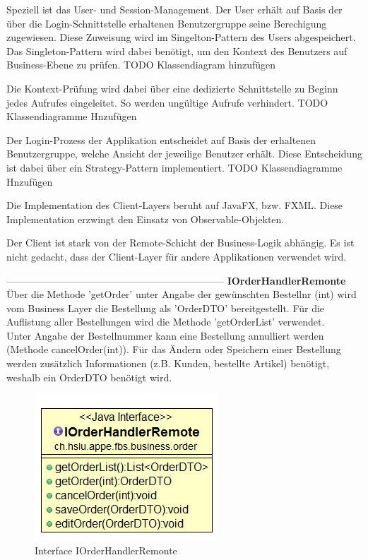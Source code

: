 Speziell ist das User- und Session-Management. Der User erhält auf Basis der über die Login-Schnittstelle erhaltenen Benutzergruppe seine Berechigung zugewiesen. Diese Zuweisung wird im Singelton-Pattern des Users abgespeichert.
Das Singleton-Pattern wird dabei benötigt, um den Kontext des Benutzers auf Business-Ebene zu prüfen.
TODO Klassendiagram hinzufügen

Die Kontext-Prüfung wird dabei über eine dedizierte Schnittstelle zu Beginn jedes Aufrufes eingeleitet. So werden ungültige Aufrufe verhindert.
TODO Klassendiagramme Hnzufügen

Der Login-Prozess der Applikation entscheidet auf Basis der erhaltenen Benutzergruppe, welche Ansicht der jeweilige Benutzer erhält. Diese Entscheidung ist dabei über ein Strategy-Pattern implementiert. 
TODO Klassendiagramme Hnzufügen

Die Implementation des Client-Layers beruht auf JavaFX, bzw. FXML. Diese Implementation erzwingt den Einsatz von Observable-Objekten.

Der Client ist stark von der Remote-Schicht der Business-Logik abhängig. Es ist nicht gedacht, dass der Client-Layer für andere Applikationen verwendet wird.
\newline

------------------------------------------------------------------
\textbf{IOrderHandlerRemonte}\\
Über die Methode 'getOrder' unter Angabe der gewünschten Bestellnr (int) wird vom Business Layer die Bestellung als 'OrderDTO' bereitgestellt. Für die Auflistung aller Bestellungen wird die Methode 'getOrderList' verwendet.\\
Unter Angabe der Bestellnummer kann eine Bestellung annulliert werden (Methode cancelOrder(int)). Für das Ändern oder Speichern einer Bestellung werden zusätzlich Informationen (z.B. Kunden, bestellte Artikel) benötigt, weshalb ein OrderDTO benötigt wird.


\begin{figure}[H]
	\includegraphics[width=0.3\linewidth]{Images/IOrderHandlerRemonte}
	\caption{Interface IOrderHandlerRemonte}
	\label{fig:if-IOrderHandlerRemonte}
\end{figure}

